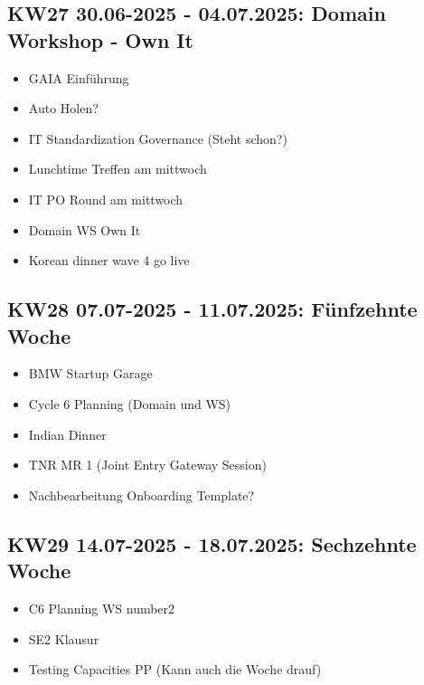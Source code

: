 \subsection{KW27 30.06-2025 - 04.07.2025: Domain Workshop - Own It}
\begin{itemize}
  \item GAIA Einführung
  \item Auto Holen?
  \item IT Standardization Governance (Steht schon?)
  \item Lunchtime Treffen am mittwoch
  \item IT PO Round am mittwoch
  \item Domain WS Own It
  \item Korean dinner wave 4 go live
\end{itemize}


\subsection{KW28 07.07-2025 - 11.07.2025: Fünfzehnte Woche}
\begin{itemize}
  \item BMW Startup Garage
  \item Cycle 6 Planning (Domain und WS)
  \item Indian Dinner
  \item TNR MR 1 (Joint Entry Gateway Session)
  \item Nachbearbeitung Onboarding Template?
\end{itemize}


\subsection{KW29 14.07-2025 - 18.07.2025: Sechzehnte Woche}
\begin{itemize}
  \item C6 Planning WS number2
  \item SE2 Klausur
  \item Testing Capacities PP (Kann auch die Woche drauf)
\end{itemize}


